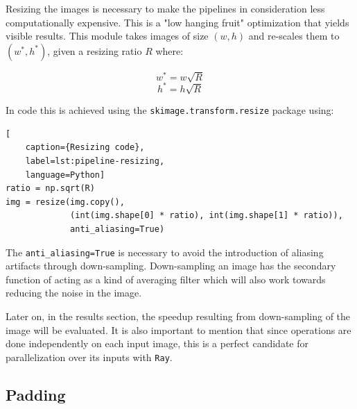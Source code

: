 Resizing the images is necessary to make the pipelines in consideration less computationally expensive. This is a "low hanging fruit" optimization that yields visible results. This module takes images of size \((w, h)\) and re-scales them to \((w^*, h^*)\), given a resizing ratio \(R\) where:

\[w^* = w\sqrt{R}\]
\[h^* = h\sqrt{R}\]

In code this is achieved using the \texttt{skimage.transform.resize} package using:

\begin{lstlisting}[
    caption={Resizing code},
    label=lst:pipeline-resizing,
    language=Python]
ratio = np.sqrt(R)
img = resize(img.copy(), 
             (int(img.shape[0] * ratio), int(img.shape[1] * ratio)), 
             anti_aliasing=True)
\end{lstlisting}

The \lstinline{anti_aliasing=True} is necessary to avoid the introduction of aliasing artifacts through down-sampling. Down-sampling an image has the secondary function of acting as a kind of averaging filter which will also work towards reducing the noise in the image. 

Later on, in the results section, the speedup resulting from down-sampling of the image will be evaluated. It is also important to mention that since operations are done independently on each input image, this is a perfect candidate for parallelization over its inputs with \texttt{Ray}.

\subsection{Padding}

